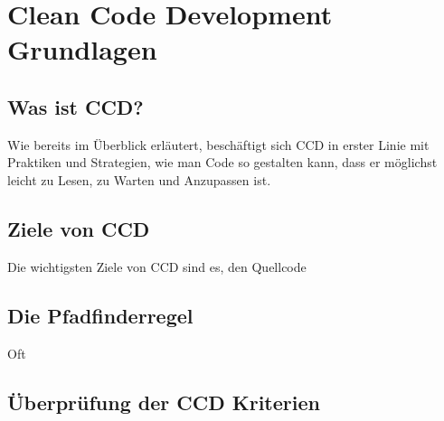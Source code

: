 \chapter{Clean Code Development Grundlagen}
\section{Was ist CCD?}
Wie bereits im Überblick erläutert, beschäftigt sich CCD in erster Linie mit Praktiken und Strategien, wie man Code so gestalten kann, dass er möglichst leicht zu Lesen, zu Warten und Anzupassen ist. 

\section{Ziele von CCD}
Die wichtigsten Ziele von CCD sind es, den Quellcode 

\section{Die Pfadfinderregel}
Oft 

\section{Überprüfung der CCD Kriterien}